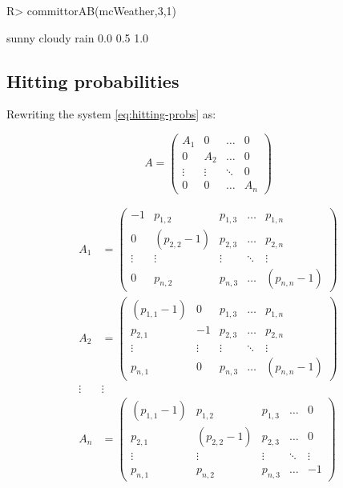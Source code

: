 \documentclass[
  nojss]{jss}
\begin{document}
\begin{CodeChunk}

\begin{CodeInput}
R> committorAB(mcWeather,3,1)
\end{CodeInput}

\begin{CodeOutput}
 sunny cloudy   rain 
   0.0    0.5    1.0 
\end{CodeOutput}
\end{CodeChunk}

\hypertarget{hitting-probabilities}{%
\subsection{Hitting probabilities}\label{hitting-probabilities}}

Rewriting the system \eqref{eq:hitting-probs} as:

\begin{equation*}
A = \left(\begin{array}{c|c|c|c}
  A_1 & 0 & \ldots & 0 \\
\hline
  0 & A_2 & \ldots & 0 \\
\hline
  \vdots & \vdots & \ddots & 0 \\
\hline
  0 & 0 & \ldots & A_n
\end{array}\right)
\end{equation*}

\begin{eqnarray*}
A_1 &= 
\left(\begin{matrix}
  -1     & p_{1,2}       & p_{1,3}   & \ldots & p_{1,n} \\
  0      & (p_{2,2} - 1) & p_{2,3}   & \ldots & p_{2,n} \\
  \vdots & \vdots        & \vdots    & \ddots & \vdots  \\
  0      & p_{n, 2}      & p_{n,3}   & \ldots & (p_{n,n} - 1)
  \end{matrix}\right)\\
A_2 &= \left(\begin{matrix}
  (p_{1,1} - 1) & 0      & p_{1,3}   & \ldots & p_{1,n} \\
  p_{2,1}       & -1     & p_{2,3}   & \ldots & p_{2,n} \\
  \vdots        & \vdots & \vdots    & \ddots & \vdots  \\
  p_{n,1}       & 0      & p_{n,3}   & \ldots & (p_{n,n} - 1)
  \end{matrix}\right)\\
\vdots & \vdots\\
A_n &= \left(\begin{matrix}
  (p_{1,1} - 1) & p_{1,2}      & p_{1,3}   & \ldots & 0 \\
  p_{2,1}       & (p_{2,2} -1) & p_{2,3}   & \ldots & 0 \\
  \vdots        & \vdots       & \vdots    & \ddots & \vdots  \\
  p_{n,1}       & p_{n,2}      & p_{n,3}   & \ldots & -1
  \end{matrix}\right)\\
\end{eqnarray*}
\end{document}
